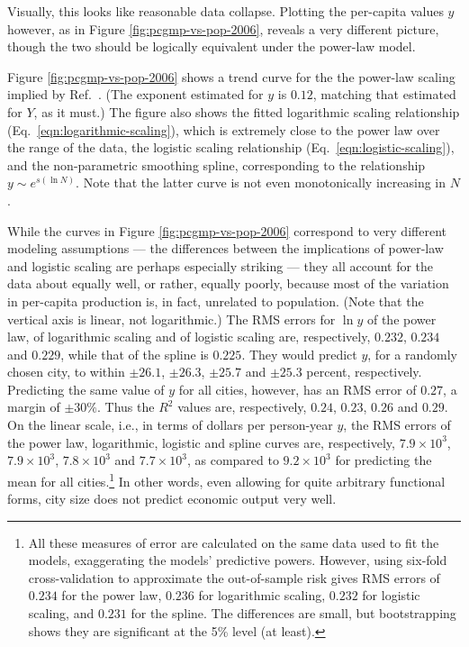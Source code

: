 \documentclass{pnastwo}
\begin{document}
\begin{article}
Visually, this looks like reasonable data collapse.  Plotting the per-capita
values $y$ however, as in Figure \ref{fig:pcgmp-vs-pop-2006}, reveals a very
different picture, though the two should be logically equivalent under the
power-law model.

Figure \ref{fig:pcgmp-vs-pop-2006} shows a trend curve for the the power-law
scaling implied by Ref.\ \cite{Bettencout-et-al-growth-innovation-scaling}.
(The exponent estimated for $y$ is $0.12$, matching that estimated for $Y$, as
it must.)  The figure also shows the fitted logarithmic scaling relationship
(Eq.\ \ref{eqn:logarithmic-scaling}), which is extremely close to the power law
over the range of the data, the logistic scaling relationship (Eq.\
\ref{eqn:logistic-scaling}), and the non-parametric smoothing spline,
corresponding to the relationship $y \sim e^{s(\ln{N})}$.  Note that the latter
curve is not even monotonically increasing in $N$.

While the curves in Figure \ref{fig:pcgmp-vs-pop-2006} correspond to very
different modeling assumptions --- the differences between the implications of
power-law and logistic scaling are perhaps especially striking --- they all
account for the data about equally well, or rather, equally poorly, because
most of the variation in per-capita production is, in fact, unrelated to
population.  (Note that the vertical axis is linear, not logarithmic.) The RMS
errors for $\ln{y}$ of the power law, of logarithmic scaling and of logistic
scaling are, respectively, $0.232$, $0.234$ and $0.229$, while that of the
spline is $0.225$.  They would predict $y$, for a randomly chosen city, to
within $\pm 26.1$, $\pm 26.3$, $\pm 25.7$ and $\pm 25.3$ percent, respectively.
Predicting the same value of $y$ for all cities, however, has an RMS error of
$0.27$, a margin of $\pm 30\%$.  Thus the $R^2$ values are, respectively,
$0.24$, $0.23$, $0.26$ and $0.29$.  On the linear scale, i.e., in terms of
dollars per person-year $y$, the RMS errors of the power law, logarithmic,
logistic and spline curves are, respectively, $7.9\times{10}^3$,
$7.9\times{10}^3$, $7.8\times{10}^3$ and $7.7\times{10}^3$, as compared to
$9.2\times{10}^3$ for predicting the mean for all cities.\footnote{All these
  measures of error are calculated on the same data used to fit the models,
  exaggerating the models' predictive powers.  However, using six-fold
  cross-validation to approximate the out-of-sample risk gives RMS errors of
  $0.234$ for the power law, $0.236$ for logarithmic scaling, $0.232$ for
  logistic scaling, and $0.231$ for the spline.  The differences are small, but
  bootstrapping shows they are significant at the 5\% level (at least).}  In
other words, even allowing for quite arbitrary functional forms, city size does
not predict economic output very well.


\end{article}
\end{document}
